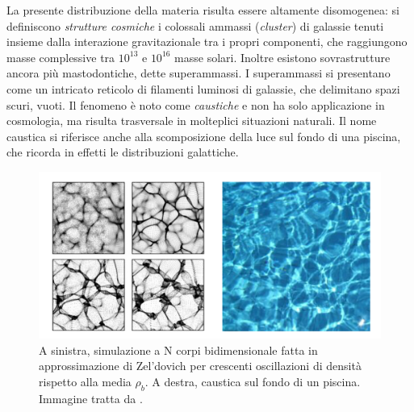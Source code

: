 La presente distribuzione della materia risulta essere altamente disomogenea: si definiscono 
\textit{strutture cosmiche} i colossali ammassi (\textit{cluster}) di galassie tenuti insieme dalla
interazione gravitazionale tra i propri componenti, che raggiungono masse complessive tra $10^{13}$
e $10^{16}$ masse solari. Inoltre esistono sovrastrutture ancora più mastodontiche, dette superammassi.
I superammassi si presentano come un intricato reticolo di filamenti luminosi di galassie, che delimitano
spazi scuri, vuoti. Il fenomeno è noto come \textit{caustiche} e non ha solo applicazione in cosmologia, ma 
risulta trasversale in molteplici situazioni naturali. Il nome caustica si riferisce anche alla scomposizione
della luce sul fondo di una piscina, che ricorda in effetti le distribuzioni galattiche.

\begin{center}
	\begin{figure}[H]
		\centering
		\includegraphics[scale=0.25, angle=0]{caustica.png}
        \caption{A sinistra, simulazione a N corpi bidimensionale fatta in approssimazione di Zel'dovich per crescenti
        oscillazioni di densità rispetto alla media $\rho_b$. A destra, caustica sul fondo di un piscina. Immagine tratta da \cite{gurbatov}.}
		\label{fig:caustica}
	\end{figure}
\end{center}

